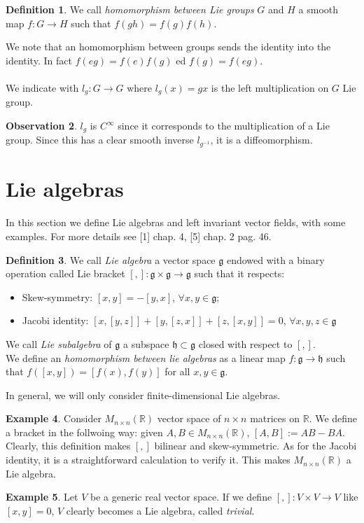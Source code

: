 \documentclass[12pt,a4paper]{report}
\theoremstyle{definition}
\newtheorem{Def}{Definition}[chapter]
\theoremstyle{Theorem}
\theoremstyle{definition}
\newtheorem{Ex}[Def]{Example}
\theoremstyle{definition}
\newtheorem{Obs}[Def]{Observation}
\begin{document}
	\begin{Def}
		We call \textit{homomorphism between Lie groups} $G$ and $H$ a smooth map $f:G\rightarrow H$ such that $f(gh)=f(g)f(h)$.
	\end{Def}
	We note that an homomorphism between groups sends the identity into the identity. In fact $f(eg)=f(e)f(g)$ ed $f(g)=f(eg)$.\\\\
	We indicate with $l_g:G\rightarrow G$ where $l_g(x)=gx$ is the left multiplication on $G$ Lie group.
	\begin{Obs}
		$l_g$ is $C^\infty$ since it corresponds to the multiplication of a Lie group. Since this has a clear smooth inverse $l_{g^{-1}}$, it is a diffeomorphism.
	\end{Obs}
	\section{Lie algebras}
	In this section we define Lie algebras and left invariant vector fields, with some examples. For more details see [1] chap. 4, [5] chap. 2 pag. 46.
	\begin{Def}
		We call \textit{Lie algebra} a vector space $\mathfrak{g}$ endowed with a binary operation called Lie bracket $[,]:\mathfrak{g}\times\mathfrak{g}\rightarrow\mathfrak{g}$ such that it respects:
		\begin{itemize}
			\item Skew-symmetry: $[x,y]=-[y,x]$, $\forall x,y\in\mathfrak{g}$;
			\item Jacobi identity: $[x,[y,z]]+[y,[z,x]]+[z,[x,y]]=0$, $\forall x,y,z\in \mathfrak{g}$ 
		\end{itemize}
		We call \textit{Lie subalgebra} of $\mathfrak{g}$ a subspace $\mathfrak{h}\subset\mathfrak{g}$ closed with respect to $[,]$.\\
		We define an \textit{homomorphism between lie algebras} as a linear map $f:\mathfrak{g}\rightarrow\mathfrak{h}$ such that $f([x,y])=[f(x),f(y)]$ for all $x,y\in\mathfrak{g}$.
	\end{Def}
	In general, we will only consider finite-dimensional Lie algebras.
	\begin{Ex} \label{Obs: bracket Mnn}
		Consider $M_{n\times n}(\mathbb{R})$ vector space of $n\times n$ matrices on $\mathbb{R}$. We define a bracket in the follwoing way: given $A,B\in M_{n\times n}(\mathbb{R})$, $[A,B]:= AB-BA$. Clearly, this definition makes $[,]$ bilinear and skew-symmetric. As for the Jacobi identity, it is a straightforward calculation to verify it. This makes $M_{n\times n}(\mathbb{R})$ a Lie algebra. 
	\end{Ex}
	\begin{Ex}
		Let $V$ be a generic real vector space. If we define $[,]:V\times V\rightarrow V$ like $[x,y]=0$, $V$ clearly becomes a Lie algebra, called \textit{trivial}.
	\end{Ex}
\end{document}
